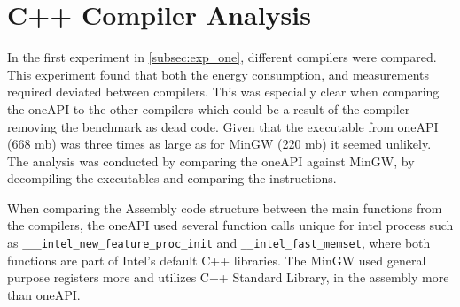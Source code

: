 \section{C++ Compiler Analysis}\label{app:compiler-analysis}

In the first experiment in \cref{subsec:exp_one}, different compilers were compared. This experiment found that both the energy consumption, and measurements required deviated between compilers. This was especially clear when comparing the oneAPI to the other compilers which could be a result of the compiler removing the benchmark as dead code. Given that the executable from oneAPI (668 mb) was three times as large as for MinGW (220 mb) it seemed unlikely. The analysis was conducted by comparing the oneAPI against MinGW, by decompiling the executables and comparing the instructions.

When comparing the Assembly code structure between the main functions from the compilers, the oneAPI used several function calls unique for intel process such as \texttt{\_\_\_intel\_new\_feature\_proc\_init} and \texttt{\_\_intel\_fast\_memset}, where both functions are part of Intel's default C++ libraries\cite{Intelassembly}. The MinGW used general purpose registers more and utilizes C++ Standard Library, in the assembly more than oneAPI.





